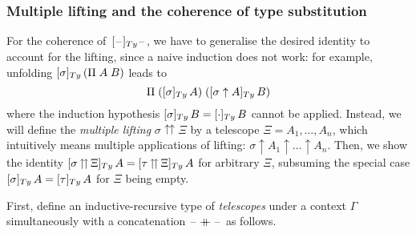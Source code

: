 \documentclass[a4paper,UKenglish,numberwithinsect,cleveref,thm-restate]{lipics-v2021}
\begin{document}
\subsubsection{Multiple lifting and the coherence of type substitution}
For the coherence of~$[\blank]_{\Ty}\blank$, we have to generalise the desired identity to account for the lifting, since a naive induction does not work: for example, unfolding $[\sigma]_{\Ty}\,(\Pi\;A\;B)$ leads to
\[
  \Pi\;([\sigma]_{\Ty}\,A)\;([\sigma\uparrow A]_{\Ty}\,B)
\]
where the induction hypothesis $[\sigma]_{\Ty}\,B = [\emptysub]_{\Ty}\,B$ cannot be applied.
Instead, we will define the \emph{multiple lifting} $\sigma \upuparrows \Xi$ by a telescope $\Xi = A_1, \dots, A_n$, which intuitively means multiple applications of lifting: $\sigma \uparrow A_1 \uparrow \dots \uparrow A_n$.
Then, we show the identity
$[\sigma \mathop{\upuparrows} \Xi ]_{\Ty}\,A = [\tau \mathop{\upuparrows} \Xi ]_{\Ty}\,A$
for arbitrary $\Xi$, subsuming the special case $[\sigma ]_{\Ty}\,A = [\tau ]_{\Ty}\,A$ for $\Xi$ being empty.

First, define an inductive-recursive type of \emph{telescopes} under a context $\Gamma$ simultaneously with a concatenation $\mathord{\hspace{1pt}\text{--}\hspace{1pt}} \mathbin{+\mkern-10mu+} \mathord{\hspace{1pt}\text{--}\hspace{1pt}}$ as follows.
\end{document}
